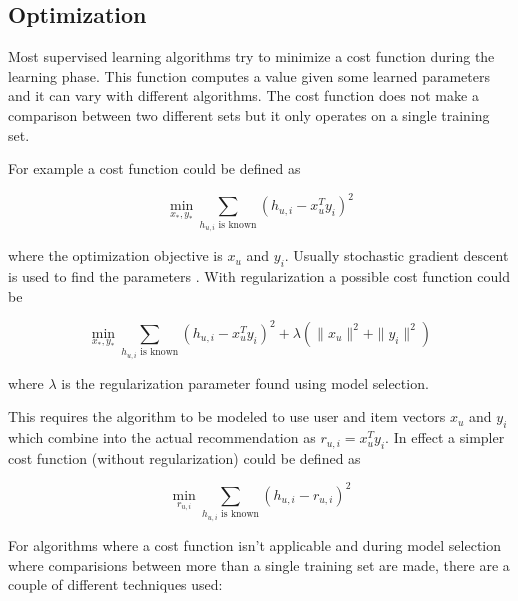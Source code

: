 
\subsection{Optimization}\label{sec:background:theory:opt}

Most supervised learning algorithms try to minimize a cost function during the learning phase. This function computes a value given some learned parameters and it can vary with different algorithms. The cost function does not make a comparison between two different sets but it only operates on a single training set.

For example a cost function could be defined as

\begin{equation}
    \min_{x_*, y_*} \sum_{h_{u,i} \text{ is known} } (h_{u, i} - x_{u}^T y_i)^2
\end{equation}

where the optimization objective is $x_u$ and $y_i$. Usually stochastic gradient descent is used to find the parameters \cite{hu2008collaborative}. With regularization a possible cost function could be

\begin{equation}
    \min_{x_*, y_*} \sum_{h_{u,i} \text{ is known} } (h_{u, i} - x_{u}^T y_i)^2 + \lambda(\|x_u\|^2 + \|y_i\|^2)
\end{equation}

where $\lambda$ is the regularization parameter found using model selection.

This requires the algorithm to be modeled to use user and item vectors $x_u$ and $y_i$ which combine into the actual recommendation as $r_{u, i} = x_u^T y_i$. In effect a simpler cost function (without regularization) could be defined as

\begin{equation}
    \min_{r_{u, i}} \sum_{h_{u,i} \text{ is known} } (h_{u, i} - r_{u, i})^2
\end{equation}


For algorithms where a cost function isn't applicable and during model selection where comparisions between more than a single training set are made, there are a couple of different techniques used:

